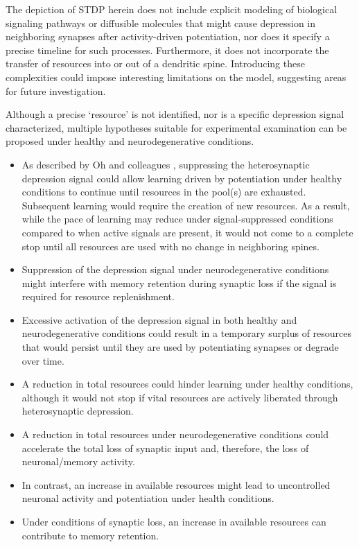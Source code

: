 \documentclass[utf8]{FrontiersinHarvard} %
\begin{document}
The depiction of STDP herein does not include explicit modeling of biological signaling pathways or diffusible molecules that might cause depression in neighboring synapses after activity-driven potentiation, nor does it specify a precise timeline for such processes. Furthermore, it does not incorporate the transfer of resources into or out of a dendritic spine. Introducing these complexities could impose interesting limitations on the model, suggesting areas for future investigation.

Although a precise `resource' is not identified, nor is a specific depression signal characterized, multiple hypotheses suitable for experimental examination can be proposed under healthy and neurodegenerative conditions.

\begin{itemize}
    \item As described by Oh and colleagues \citeyearpar{Oh.2015}, suppressing the heterosynaptic depression signal could allow learning driven by potentiation under healthy conditions to continue until resources in the pool(s) are exhausted. Subsequent learning would require the creation of new resources. As a result, while the pace of learning may reduce under signal-suppressed conditions compared to when active signals are present, it would not come to a complete stop until all resources are used with no change in neighboring spines. 
    
    \item Suppression of the depression signal under neurodegenerative conditions might interfere with memory retention during synaptic loss if the signal is required for resource replenishment.
    
    \item Excessive activation of the depression signal in both healthy and neurodegenerative conditions could result in a temporary surplus of resources that would persist until they are used by potentiating synapses or degrade over time.
    
    \item A reduction in total resources could hinder learning under healthy conditions, although it would not stop if vital resources are actively liberated through heterosynaptic depression.

    \item A reduction in total resources under neurodegenerative conditions could accelerate the total loss of synaptic input and, therefore, the loss of neuronal/memory activity.

    \item In contrast, an increase in available resources might lead to uncontrolled neuronal activity and potentiation under health conditions.
    
    \item Under conditions of synaptic loss, an increase in available resources can contribute to memory retention.
\end{itemize}
\end{document}
